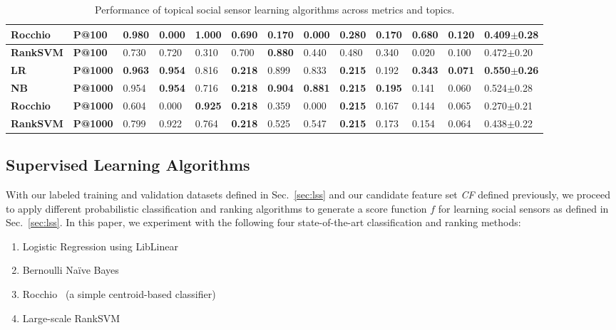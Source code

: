 \begin{table*}[t!]
{{\begin{tabular}{|l|l|l|l|l|l|l|l|l|l|l|l|l|}
\textbf{Rocchio} & \textbf{P@100} & \textbf{0.980} & 0.000 & \textbf{1.000} & 0.690 & 0.170 & 0.000 & 0.280 & 0.170 & 0.680 & 0.120 & 0.409$\pm$0.28 \\ \hline
\textbf{RankSVM} & \textbf{P@100} & 0.730 & 0.720 & 0.310 & 0.700 & \textbf{0.880} & 0.440 & 0.480 & 0.340 & 0.020 & 0.100 & 0.472$\pm$0.20 \\ \hline \hline
\textbf{LR} & \textbf{P@1000} & \textbf{0.963} & \textbf{0.954} & 0.816 & \textbf{0.218} & 0.899 & 0.833 & \textbf{0.215} & 0.192 & \textbf{0.343} & \textbf{0.071} & \textbf{0.550$\pm$0.26} \\ \hline
\textbf{NB} & \textbf{P@1000} & 0.954 & \textbf{0.954} & 0.716 & \textbf{0.218} & \textbf{0.904} & \textbf{0.881} & \textbf{0.215} & \textbf{0.195} & 0.141 & 0.060 & 0.524$\pm$0.28 \\ \hline
\textbf{Rocchio} & \textbf{P@1000} & 0.604 & 0.000 & \textbf{0.925} & \textbf{0.218} & 0.359 & 0.000 & \textbf{0.215} & 0.167 & 0.144 & 0.065 & 0.270$\pm$0.21 \\ \hline
\textbf{RankSVM} & \textbf{P@1000} & 0.799 & 0.922 & 0.764 & \textbf{0.218} & 0.525 & 0.547 & \textbf{0.215} & 0.173 & 0.154 & 0.064 & 0.438$\pm$0.22 \\ \hline
\end{tabular}
}}
\caption{Performance of topical social sensor learning algorithms across metrics and topics.} 
\label{table:results2}
\end{table*}

\subsection{Supervised Learning Algorithms}

With our labeled training and validation datasets defined in
Sec.~\ref{sec:lss} and our candidate feature set \textit{CF} defined
previously, we proceed to apply different probabilistic classification and ranking
algorithms to generate a score function $f$ for learning social sensors
as defined in Sec.~\ref{sec:lss}.  In this paper, we experiment with
the following four state-of-the-art classification and ranking methods:
\begin{enumerate}
\item Logistic Regression using LibLinear~\cite{liblinear}
\item Bernoulli Na\"{i}ve Bayes~\cite{mccallum98nb}
\item Rocchio~\cite{manning_ir} (a simple centroid-based classifier)
\item Large-scale RankSVM~\cite{largescale_ranksvm}
\end{enumerate}

